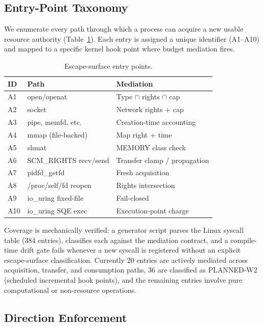\documentclass[letterpaper,twocolumn,10pt]{article}
\begin{document}
\subsection{Entry-Point Taxonomy}

We enumerate every path through which a process can acquire a new
usable resource authority (Table~\ref{tab:entrypoints}).  Each entry
is assigned a unique identifier (A1--A10) and mapped to a specific
kernel hook point where budget mediation fires.

\begin{table}[t]
\centering
\caption{Escape-surface entry points.}
\label{tab:entrypoints}
\small
\begin{tabular}{@{}llp{2.9cm}@{}}
\toprule
\textbf{ID} & \textbf{Path} & \textbf{Mediation} \\
\midrule
A1 & open/openat & Type $\cap$ rights $\cap$ cap \\
A2 & socket & Network rights + cap \\
A3 & pipe, memfd, etc. & Creation-time accounting \\
A4 & mmap (file-backed) & Map right + time \\
A5 & shmat & MEMORY class check \\
A6 & SCM\_RIGHTS recv/send & Transfer clamp / propagation \\
A7 & pidfd\_getfd & Fresh acquisition \\
A8 & /proc/self/fd reopen & Rights intersection \\
A9 & io\_uring fixed-file & Fail-closed \\
A10 & io\_uring SQE exec & Execution-point charge \\
\bottomrule
\end{tabular}
\end{table}

Coverage is mechanically verified: a generator script parses the Linux
syscall table (384 entries), classifies each against the mediation contract,
and a compile-time drift gate fails whenever a new syscall is registered
without an explicit escape-surface classification.  Currently 20 entries are
actively mediated across acquisition, transfer, and consumption paths, 36 are
classified as PLANNED-W2 (scheduled incremental hook points), and the
remaining entries involve pure computational or non-resource operations.

\subsection{Direction Enforcement}
\end{document}
